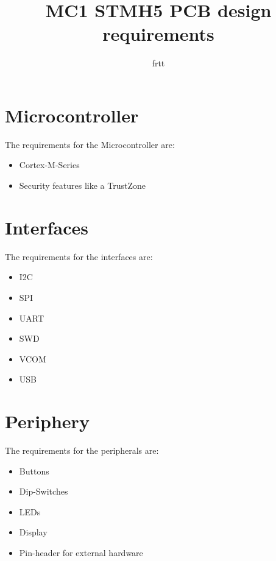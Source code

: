 \documentclass{article}
\title{MC1 STMH5 PCB design requirements}
\author{frtt}
\begin{document}
\maketitle

\section{Microcontroller}
The requirements for the Microcontroller are:\\
\begin{itemize}
    \item Cortex-M-Series
    \item Security features like a TrustZone
\end{itemize}
\section{Interfaces}
The requirements for the interfaces are:\\
\begin{itemize}
    \item I2C
    \item SPI
    \item UART
    \item SWD
    \item VCOM
    \item USB
\end{itemize}

\section{Periphery}
The requirements for the peripherals are:\\
\begin{itemize}
    \item Buttons
    \item Dip-Switches
    \item LEDs 
    \item Display
    \item Pin-header for external hardware\\
\end{itemize}
\end{document}
